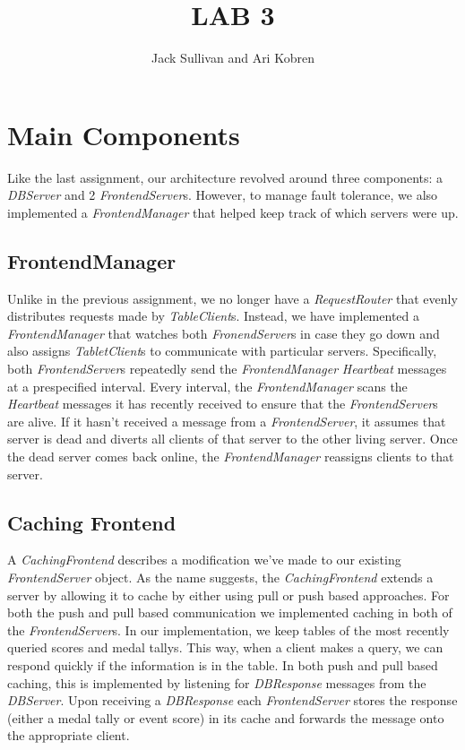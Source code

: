 \documentclass[11pt]{article}
\begin{document}
\title{LAB 3}
\author{Jack Sullivan and Ari Kobren}
\maketitle

\section{Main Components}
\label{sec:main}
Like the last assignment, our architecture revolved around three
components: a \emph{DBServer} and 2 \emph{FrontendServer}s.  However,
to manage fault tolerance, we also implemented a
\emph{FrontendManager} that helped keep track of which servers were
up.

\subsection{FrontendManager}
\label{subsec:manager}
Unlike in the previous assignment, we no longer have a
\emph{RequestRouter} that evenly distributes requests made by
\emph{TableClient}s.  Instead, we have implemented a
\emph{FrontendManager} that watches both \emph{FronendServer}s in case
they go down and also assigns \emph{TabletClient}s to communicate with
particular servers.  Specifically, both \emph{FrontendServer}s
repeatedly send the \emph{FrontendManager} \emph{Heartbeat} messages
at a prespecified interval.  Every interval, the
\emph{FrontendManager} scans the \emph{Heartbeat} messages it has
recently received to ensure that the \emph{FrontendServer}s are
alive.  If it hasn't received a message from a \emph{FrontendServer},
it assumes that server is dead and diverts all clients of that server
to the other living server.  Once the dead server comes back online,
the \emph{FrontendManager} reassigns clients to that server.

\subsection{Caching Frontend}
\label{subsec:caching}
A \emph{CachingFrontend} describes a modification we've made to our
existing \emph{FrontendServer} object. As the name suggests, the
\emph{CachingFrontend} extends a server by allowing it to cache by
either using pull or push based approaches.  For both the push and
pull based communication we implemented caching in both of the
\emph{FrontendServer}s.  In our implementation, we keep tables of the
most recently queried scores and medal tallys.  This way, when a
client makes a query, we can respond quickly if the information is in
the table.  In both push and pull based caching, this is implemented
by listening for \emph{DBResponse} messages from the \emph{DBServer}.
Upon receiving a \emph{DBResponse} each \emph{FrontendServer} stores
the response (either a medal tally or event score) in its cache and
forwards the message onto the appropriate client.
\end{document}
